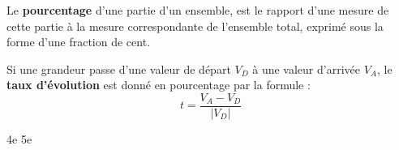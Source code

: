 \def\theme{Pourcentages et taux d'évolution.}
\def\date{23/10/2023}

\hbox{}

Le \textbf{pourcentage} d'une partie d'un ensemble, 
est le rapport d'une mesure de cette partie à la mesure correspondante de l'ensemble total, 
exprimé sous la forme d'une fraction de cent.

Si une grandeur passe d'une valeur de départ $V_D$ à une valeur d'arrivée $V_A$, 
le \textbf{taux d'évolution} est donné en pourcentage par la formule :
\begin{equation*}
    t = \dfrac{V_A-V_D}{|V_D|}
\end{equation*}

\csname 4e\endcsname
\csname 5e\endcsname
